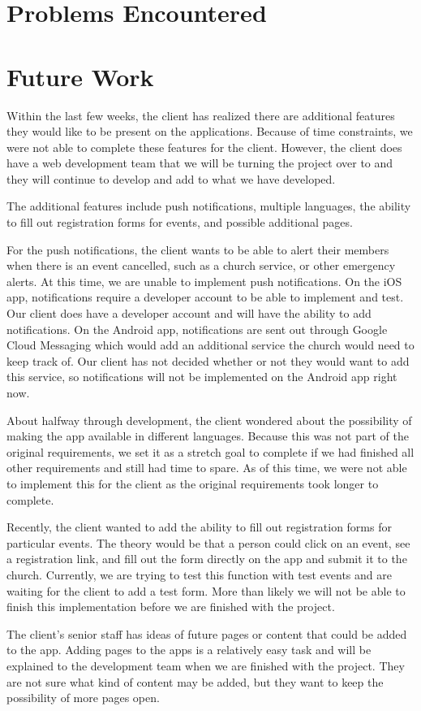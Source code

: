 \documentclass[letterpaper,10pt,draftclsnofoot,onecolumn,titlepage]{IEEEtran}
\begin{document}
\section{Problems Encountered}

\section{Future Work}
		Within the last few weeks, the client has realized there are additional features they would like to be present on the applications. 
		Because of time constraints, we were not able to complete these features for the client. 
		However, the client does have a web development team that we will be turning the project over to and they will continue to develop and add to what we have developed. 
		
		The additional features include push notifications, multiple languages, the ability to fill out registration forms for events, and possible additional pages. 
		
		For the push notifications, the client wants to be able to alert their members when there is an event cancelled, such as a church service, or other emergency alerts. 
		At this time, we are unable to implement push notifications. 
		On the iOS app, notifications require a developer account to be able to implement and test. 
		Our client does have a developer account and will have the ability to add notifications. 
		On the Android app, notifications are sent out through Google Cloud Messaging which would add an additional service the church would need to keep track of. 
		Our client has not decided whether or not they would want to add this service, so notifications will not be implemented on the Android app right now. 
		
		About halfway through development, the client wondered about the possibility of making the app available in different languages. 
		Because this was not part of the original requirements, we set it as a stretch goal to complete if we had finished all other requirements and still had time to spare. 
		As of this time, we were not able to implement this for the client as the original requirements took longer to complete. 
		
		Recently, the client wanted to add the ability to fill out registration forms for particular events. 
		The theory would be that a person could click on an event, see a registration link, and fill out the form directly on the app and submit it to the church. 
		Currently, we are trying to test this function with test events and are waiting for the client to add a test form. 
		More than likely we will not be able to finish this implementation before we are finished with the project. 
		
		The client's senior staff has ideas of future pages or content that could be added to the app. 
		Adding pages to the apps is a relatively easy task and will be explained to the development team when we are finished with the project. 
		They are not sure what kind of content may be added, but they want to keep the possibility of more pages open.
		
	




	
\end{document}
